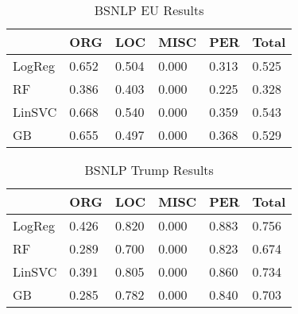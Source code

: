 \begin{table}[ht]
\centering
\caption{BSNLP EU Results}
\label{bsnlp_eu}
\begin{tabular}{|l|l|l|l|l|l|}
\hline
            & ORG   & LOC   & MISC  & PER   & Total \\ \hline
LogReg     & 0.652 & 0.504 & 0.000 & 0.313 & 0.525 \\ \hline
RF          & 0.386 & 0.403 & 0.000 & 0.225 & 0.328 \\ \hline
LinSVC      & 0.668 & 0.540 & 0.000 & 0.359 & 0.543 \\ \hline
GB          & 0.655 & 0.497 & 0.000 & 0.368 & 0.529 \\ \hline
\end{tabular}
\end{table}



\begin{table}[ht]
\centering
\caption{BSNLP Trump Results}
\label{bsnlp_trump}
\begin{tabular}{|l|l|l|l|l|l|}
\hline
            & ORG   & LOC   & MISC  & PER   & Total \\ \hline
LogReg      & 0.426 & 0.820 & 0.000 & 0.883 & 0.756 \\ \hline
RF          & 0.289 & 0.700 & 0.000 & 0.823 & 0.674 \\ \hline
LinSVC      & 0.391 & 0.805 & 0.000 & 0.860 & 0.734 \\ \hline
GB          & 0.285 & 0.782 & 0.000 & 0.840 & 0.703 \\ \hline
\end{tabular}
\end{table}